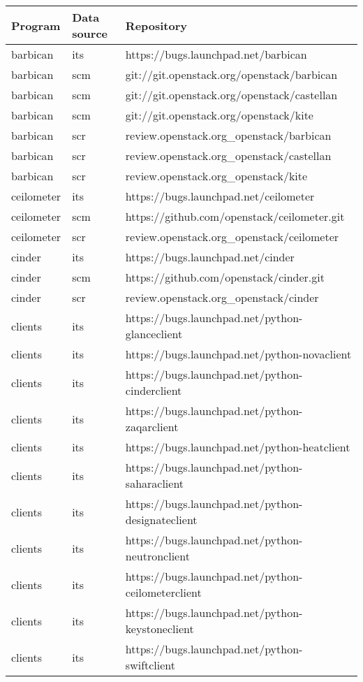 \begin{center}                                                                       
\begin{longtable}{|p{4cm}|p{1cm}|p{10cm}|}
\hline
Program & Data source & Repository \\
\hline

barbican&its&https://bugs.launchpad.net/barbican\\
barbican&scm&git://git.openstack.org/openstack/barbican\\
barbican&scm&git://git.openstack.org/openstack/castellan\\
barbican&scm&git://git.openstack.org/openstack/kite\\
barbican&scr&review.openstack.org\_openstack/barbican\\
barbican&scr&review.openstack.org\_openstack/castellan\\
barbican&scr&review.openstack.org\_openstack/kite\\
ceilometer&its&https://bugs.launchpad.net/ceilometer\\
ceilometer&scm&https://github.com/openstack/ceilometer.git\\
ceilometer&scr&review.openstack.org\_openstack/ceilometer\\
cinder&its&https://bugs.launchpad.net/cinder\\
cinder&scm&https://github.com/openstack/cinder.git\\
cinder&scr&review.openstack.org\_openstack/cinder\\
clients&its&https://bugs.launchpad.net/python-glanceclient\\
clients&its&https://bugs.launchpad.net/python-novaclient\\
clients&its&https://bugs.launchpad.net/python-cinderclient\\
clients&its&https://bugs.launchpad.net/python-zaqarclient\\
clients&its&https://bugs.launchpad.net/python-heatclient\\
clients&its&https://bugs.launchpad.net/python-saharaclient\\
clients&its&https://bugs.launchpad.net/python-designateclient\\
clients&its&https://bugs.launchpad.net/python-neutronclient\\
clients&its&https://bugs.launchpad.net/python-ceilometerclient\\
clients&its&https://bugs.launchpad.net/python-keystoneclient\\
clients&its&https://bugs.launchpad.net/python-swiftclient\\

\end{longtable}
\end{center}
